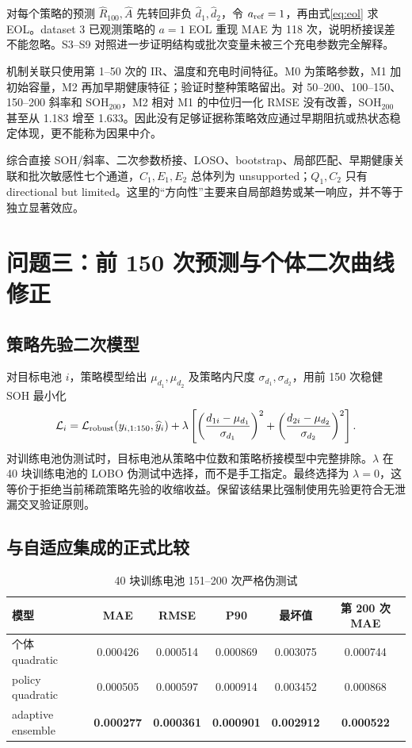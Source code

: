 \documentclass[UTF8,a4paper,zihao=-4]{ctexart}
\newcommand{\Rone}{R_{100}}
\begin{document}
对每个策略的预测 $\widehat\Rone,\widehat A$ 先转回非负 $\widehat d_1,\widehat d_2$，令 $a_{\rm ref}=1$，再由式\eqref{eq:eol} 求 EOL。dataset 3 已观测策略的 $a=1$ EOL 重现 MAE 为 118 次，说明桥接误差不能忽略。S3--S9 对照进一步证明结构或批次变量未被三个充电参数完全解释。

机制关联只使用第 1--50 次的 IR、温度和充电时间特征。M0 为策略参数，M1 加初始容量，M2 再加早期健康特征；验证时整种策略留出。对 50--200、100--150、150--200 斜率和 SOH$_{200}$，M2 相对 M1 的中位归一化 RMSE 没有改善，SOH$_{200}$ 甚至从 1.183 增至 1.633。因此没有足够证据称策略效应通过早期阻抗或热状态稳定体现，更不能称为因果中介。

综合直接 SOH/斜率、二次参数桥接、LOSO、bootstrap、局部匹配、早期健康关联和批次敏感性七个通道，$C_1,E_1,E_2$ 总体列为 unsupported；$Q_1,C_2$ 只有 directional but limited。这里的“方向性”主要来自局部趋势或某一响应，并不等于独立显著效应。

\section{问题三：前 150 次预测与个体二次曲线修正}

\subsection{策略先验二次模型}

对目标电池 $i$，策略模型给出 $\mu_{d_1},\mu_{d_2}$ 及策略内尺度 $\sigma_{d_1},\sigma_{d_2}$，用前 150 次稳健 SOH 最小化
\begin{equation}
 \mathcal L_i=\mathcal L_{\rm robust}(y_{i,1:150},\widehat y_i)
 +\lambda\left[\left(\frac{d_{1i}-\mu_{d_1}}{\sigma_{d_1}}\right)^2
 +\left(\frac{d_{2i}-\mu_{d_2}}{\sigma_{d_2}}\right)^2\right].
 \label{eq:prior}
\end{equation}
对训练电池伪测试时，目标电池从策略中位数和策略桥接模型中完整排除。$\lambda$ 在 40 块训练电池的 LOBO 伪测试中选择，而不是手工指定。最终选择为 $\lambda=0$，这等价于拒绝当前稀疏策略先验的收缩收益。保留该结果比强制使用先验更符合无泄漏交叉验证原则。

\subsection{与自适应集成的正式比较}

\begin{table}[H]
\centering
\caption{40 块训练电池 151--200 次严格伪测试}
\small
\begin{tabular}{lccccc}
\toprule
模型 & MAE & RMSE & P90 & 最坏值 & 第 200 次 MAE \\
\midrule
个体 quadratic & 0.000426 & 0.000514 & 0.000869 & 0.003075 & 0.000744 \\
policy quadratic & 0.000505 & 0.000597 & 0.000914 & 0.003452 & 0.000868 \\
adaptive ensemble & \textbf{0.000277} & \textbf{0.000361} & \textbf{0.000901} & \textbf{0.002912} & \textbf{0.000522} \\
\bottomrule
\end{tabular}
\label{tab:q3}
\end{table}
\end{document}
